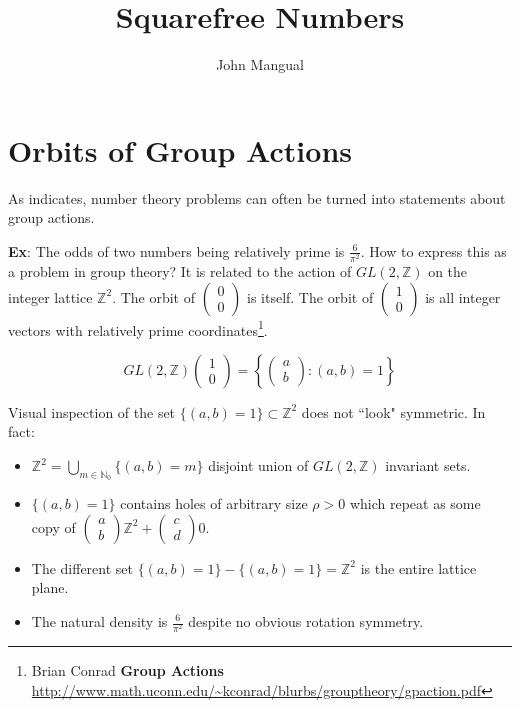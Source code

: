 \documentclass[12pt]{article}
\title{ Squarefree Numbers }
\author{John Mangual}
\date{}
\newcommand{\next}{\newline \newline \noindent}
\newcommand{\icol}[1]{%
  \left(\begin{smallmatrix}#1\end{smallmatrix}\right)%
}
\begin{document}
{\selectfont

\maketitle

\section{ Orbits of Group Actions}

As  \cite{EMMV} indicates, number theory problems can often be turned into statements about group actions.  \newline

\noindent \textbf{Ex}: The odds of two numbers being relatively prime is $\frac{6}{\pi^2}$.  How to express this as a problem in group theory? 
\next It is related to the action of $GL(2, \mathbb{Z})$ on the integer lattice $\mathbb{Z}^2$.  The orbit of $\icol{0 \\ 0}$ is itself.  The orbit of $\icol{1 \\ 0}$ is all integer vectors with relatively prime coordinates\footnote{Brian Conrad \textbf{Group Actions} \url{http://www.math.uconn.edu/~kconrad/blurbs/grouptheory/gpaction.pdf}}.

$$ GL(2, \mathbb{Z})\begin{pmatrix}1 \\ 0 \end{pmatrix} = \left\{ \begin{pmatrix}a \\ b \end{pmatrix}: (a,b)=1 \right\} $$

\noindent Visual inspection of the set $\{ (a,b) = 1\} \subset \mathbb{Z}^2$ does not ``look" symmetric.  In fact\cite{BH2}:

\begin{itemize}
\item $\mathbb{Z}^2 = \bigcup_{m \in \mathbb{N}_0} \{ (a,b) = m\}$ disjoint union of $GL(2, \mathbb{Z})$ invariant sets.
\item $\{ (a,b) = 1 \}$ contains holes of arbitrary size $\rho > 0$ which repeat as some copy of $\icol{a\\b}\mathbb{Z}^2 + \icol{c\\d}0$.
\item The different set $\{ (a,b) = 1 \} - \{ (a,b) = 1 \} = \mathbb{Z}^2$ is the entire lattice plane.
\item The natural density is $\frac{6}{\pi^2}$ despite no obvious rotation symmetry.
\end{itemize}

}
\end{document}
